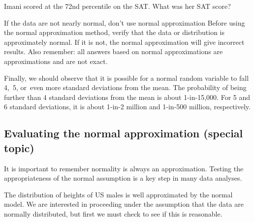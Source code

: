 \begin{exercisewrap}
\begin{nexercise}Imani scored at the 72nd percentile on the SAT. What was her SAT score?\footnotemark\end{nexercise}
\end{exercisewrap}



\begin{onebox}{If the data are not nearly normal, don't use normal approximation}
{Before using the normal approximation method, verify that the data or distribution is approximately normal. If it is not, the normal approximation will give incorrect results. Also remember:  all answers based on normal approximations are approximations and are not exact.}
\end{onebox}

Finally, we should observe that it is possible for a normal random variable to fall 4,~5, or~even more standard deviations from the mean. The probability of being further than 4 standard deviations from the mean is about 1-in-15,000. For 5 and 6 standard deviations, it is about 1-in-2 million and 1-in-500 million, respectively.  

\B{\newpage}


\subsection{Evaluating the normal approximation (special topic)}
\label{assessingNormal}

It is important to remember normality is always an approximation. Testing the appropriateness of the normal assumption is a key step in many data analyses.


The distribution of heights of US males is well approximated by the normal model. We are interested in proceeding under the assumption that the data are normally distributed, but first we must check to see if this is reasonable.

